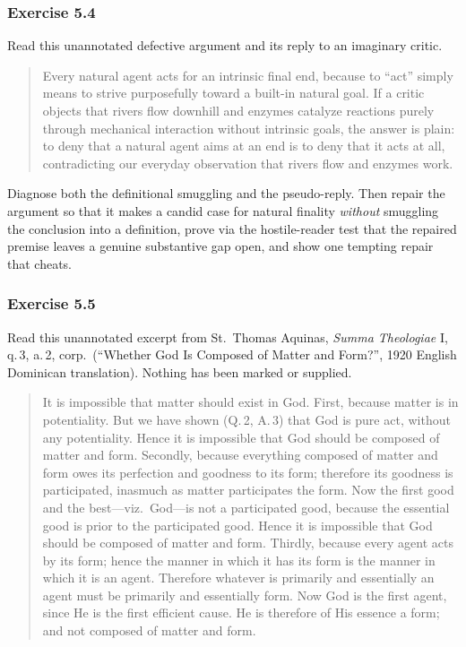 \subsubsection*{Exercise 5.4}
Read this unannotated defective argument and its reply to an imaginary critic.

\begin{quote}
Every natural agent acts for an intrinsic final end, because to ``act'' simply means to strive purposefully toward a built-in natural goal. If a critic objects that rivers flow downhill and enzymes catalyze reactions purely through mechanical interaction without intrinsic goals, the answer is plain: to deny that a natural agent aims at an end is to deny that it acts at all, contradicting our everyday observation that rivers flow and enzymes work.
\end{quote}

Diagnose both the definitional smuggling and the pseudo-reply. Then repair the argument so that it makes a candid case for natural finality \emph{without} smuggling the conclusion into a definition, prove via the hostile-reader test that the repaired premise leaves a genuine substantive gap open, and show one tempting repair that cheats.

\subsubsection*{Exercise 5.5}
Read this unannotated excerpt from St.\ Thomas Aquinas, \emph{Summa Theologiae} I, q.\,3, a.\,2, corp.\ (``Whether God Is Composed of Matter and Form?'', 1920 English Dominican translation). Nothing has been marked or supplied.

\begin{quote}
It is impossible that matter should exist in God. First, because matter is in potentiality. But we have shown (Q.\,2, A.\,3) that God is pure act, without any potentiality. Hence it is impossible that God should be composed of matter and form. Secondly, because everything composed of matter and form owes its perfection and goodness to its form; therefore its goodness is participated, inasmuch as matter participates the form. Now the first good and the best---viz.\ God---is not a participated good, because the essential good is prior to the participated good. Hence it is impossible that God should be composed of matter and form. Thirdly, because every agent acts by its form; hence the manner in which it has its form is the manner in which it is an agent. Therefore whatever is primarily and essentially an agent must be primarily and essentially form. Now God is the first agent, since He is the first efficient cause. He is therefore of His essence a form; and not composed of matter and form.
\end{quote}

